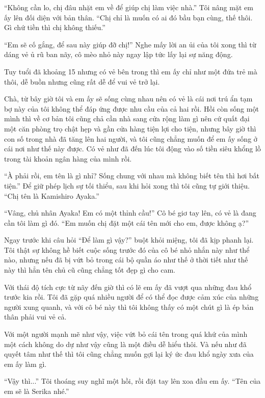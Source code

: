 {``Không cần lo, chị đâu nhặt em về để giúp chị làm việc nhà.'' Tôi nâng
mặt em ấy lên đối diện với bản thân. ``Chị chỉ là muốn có ai đó bầu bạn
cùng, thế thôi. Gì chứ tiền thì chị không thiếu.''

``Em sẽ cố gắng, để sau này giúp đỡ chị!'' Nghe mấy lời an ủi của tôi
xong thì từ dáng vẻ ủ rũ ban nãy, cô mèo nhỏ này ngay lập tức lấy lại sự
năng động.

Tuy tuổi đã khoảng 15 nhưng có vẻ bên trong thì em ấy chỉ như một đứa
trẻ mà thôi, dễ buồn nhưng cũng rất dễ để vui vẻ trở lại.

Chà, từ bây giờ tôi và em ấy sẽ sống cùng nhau nên có vẻ là cái nơi trú
ẩn tạm bợ này của tôi không thể đáp ứng được nhu cầu của cả hai rồi. Hồi
còn sống một mình thì về cơ bản tôi cũng chả cần nhà sang cửa rộng làm
gì nên cứ quất đại một căn phòng trọ chật hẹp và gần cửa hàng tiện lợi
cho tiện, nhưng bây giờ thì con số trong nhà đã tăng lên hai người, và
tôi cũng chẳng muốn để em ấy sống ở cái nơi như thế này được. Có vẻ như
đã đến lúc tôi động vào số tiền siêu khổng lồ trong tài khoản ngân hàng
của mình rồi.

``À phải rồi, em tên là gì nhỉ? Sống chung với nhau mà không biết tên
thì hơi bất tiện.'' Để giữ phép lịch sự tối thiểu, sau khi hỏi xong thì
tôi cũng tự giới thiệu. ``Chị tên là Kamishiro Ayaka.''

``Vâng, chủ nhân Ayaka! Em có một thỉnh cầu!'' Cô bé giơ tay lên, có vẻ
là đang cần tôi làm gì đó. ``Em muốn chị đặt một cái tên mới cho em,
được không ạ?''

Ngay trước khi câu hỏi ``Để làm gì vậy?'' buột khỏi miệng, tôi đã kịp
phanh lại. Tôi thật sự không hề biết cuộc sống trước đó của cô bé nhỏ
nhắn này như thể nào, nhưng nếu đã bị vứt bỏ trong cái bộ quần áo như
thế ở thời tiết như thế này thì hẳn tên chủ cũ cũng chẳng tốt đẹp gì cho
cam.

Với thái độ tích cực từ nãy đến giờ thì có lẽ em ấy đã vượt qua những
đau khổ trước kia rồi. Tôi đã gặp quá nhiều người để có thể đọc được cảm
xúc của những người xung quanh, và với cô bé này thì tôi không thấy có
một chút gì là ép bản thân phải vui vẻ cả.

Với một người mạnh mẽ như vậy, việc vứt bỏ cái tên trong quá khứ của
mình một cách không do dự như vậy cũng là một điều dễ hiểu thôi. Và nếu
như đã quyết tâm như thế thì tôi cũng chẳng muốn gợi lại ký ức đau khổ
ngày xưa của em ấy làm gì.

``Vậy thì...'' Tôi thoáng suy nghĩ một hồi, rồi đặt tay lên xoa đầu em
ấy. ``Tên của em sẽ là Serika nhé.''

}
